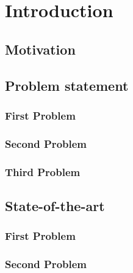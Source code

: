 \chapter{Introduction}\label{ch:introduction}

\section{Motivation}\label{sec:motivation}


\section{Problem statement}\label{sec:problem} 


\subsection{First Problem}

 
\subsection{Second Problem}


\subsection{Third Problem}



\section{State-of-the-art}\label{sec:state_of_art}

\subsection{First Problem}


\subsection{Second Problem}


